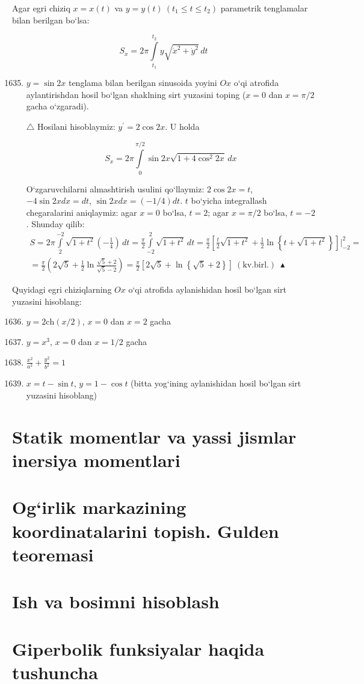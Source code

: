 Agar egri chiziq $x=x(t)$ va $y=y(t)\ (t_1\le t\le t_2)$ parametrik tenglamalar bilan berilgan bo`lsa:

$$S_{x}=2\pi\int\limits_{t_{1}}^{t_{2}}y\sqrt{\dot{x}^{2}+\dot{y}^{2}}\,dt$$
\begin{enumerate} \setcounter{enumi}{1634}
	
	\item $y=\sin 2x$ tenglama bilan berilgan sinusoida yoyini $Ox$ o`qi atrofida aylantirishdan hosil bo`lgan shaklning sirt yuzasini toping ($x=0$ dan $x=\pi/2$ gacha o`zgaradi).
	
	$\triangle$ Hosilani hisoblaymiz: $y^\prime=2\cos 2x$. U holda
	
	$$S_{x}=2\pi\int\limits_{0}^{\pi/2}\sin 2x\sqrt{1+4\cos^2 2x}\, dx$$
	
	O`zgaruvchilarni almashtirish usulini qo`llaymiz: $2\cos 2x=t$, $-4\sin 2x dx=dt$, $\sin 2x dx=(-1/4)dt$. $t$ bo`yicha integrallash chegaralarini aniqlaymiz: agar $x=0$ bo`lsa, $t=2$; agar $x=\pi/2$ bo`lsa, $t=-2$. Shunday qilib:
	\begin{multline*}
	S=2\pi\int\limits_{2}^{-2}\sqrt{1+t^{2}}\left(-\frac{1}{4}\right)\, dt=\frac{\pi}{2}\int\limits_{-2}^{2}\sqrt{1+t^2}\,dt=\frac{\pi}{2}\left[\frac{t}{2}\sqrt{1+t^2}+\frac{1}{2}\ln\left\{t+\sqrt{1+t^2}\right\}\right]\bigg|_{-2}^{2}=\\
	=\frac{\pi}{2}\left(2\sqrt{5}+\frac{1}{2}\ln\frac{\sqrt{5}+2}{\sqrt{5}-2}\right)=\frac{\pi}{2}\left[2\sqrt{5}+\ln\left\{\sqrt{5}+2\right\}\right]\ (\textrm{kv.birl.})\ \blacktriangle
\end{multline*} 
\end{enumerate}

Quyidagi egri chiziqlarning $Ox$ o`qi atrofida aylanishidan hosil bo`lgan sirt yuzasini hisoblang:
\begin{enumerate}\setcounter{enumi}{1635}
	
	\item $y=2\textrm{ch}(x/2)$, $x=0$ dan $x=2$ gacha
	\item $y=x^3$, $x=0$ dan $x=1/2$ gacha
	\item $\frac{x^{2}}{a^{2}}+\frac{y^{2}}{b^{2}}=1$
	\item $x=t-\sin t$, $y=1-\cos t$ (bitta yog`ining aylanishidan hosil bo`lgan sirt yuzasini hisoblang)
	
	
\end{enumerate}


\section{Statik momentlar va yassi jismlar inersiya momentlari}
\section{Og`irlik markazining koordinatalarini topish. Gulden teoremasi}
\section{Ish va bosimni hisoblash}
\section{Giperbolik funksiyalar haqida tushuncha}
\hspace{0.6cm}
